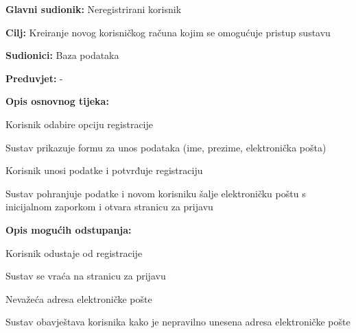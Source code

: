 					\noindent {}
					\begin{packed_item}
	
						\item \textbf{Glavni sudionik: }Neregistrirani korisnik
						\item  \textbf{Cilj:} Kreiranje novog korisničkog računa kojim se omogućuje pristup sustavu
						\item  \textbf{Sudionici:} Baza podataka
						\item  \textbf{Preduvjet:} -
						\item  \textbf{Opis osnovnog tijeka:}  
						
						\item[] \begin{packed_enum}
	
							\item Korisnik odabire opciju registracije
							\item Sustav prikazuje formu za unos podataka (ime, prezime, elektronička pošta)
							\item Korisnik unosi podatke i potvrđuje registraciju
							\item Sustav pohranjuje podatke i novom korisniku šalje elektroničku poštu s inicijalnom zaporkom i otvara stranicu za prijavu
							
						\end{packed_enum}
						
						\item  \textbf{Opis mogućih odstupanja:}
						
						\item[] \begin{packed_item}
	
							\item[3.a] Korisnik odustaje od registracije
							\item[] \begin{packed_enum}
								
								\item Sustav se vraća na stranicu za prijavu
								
							\end{packed_enum}
							
							\item[3.b] Nevažeća adresa elektroničke pošte
							\item[] \begin{packed_enum}
								
								\item Sustav obavještava korisnika kako je nepravilno unesena adresa elektroničke pošte
								

\end{packed_enum}
\end{packed_item}
\end{packed_item}

